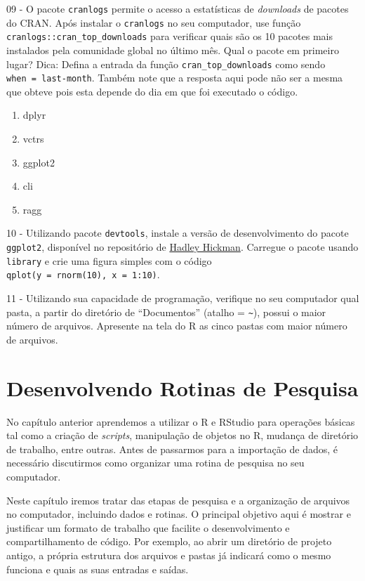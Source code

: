 \documentclass[
  11pt,
]{book}
\providecommand{\tightlist}{%
  \setlength{\itemsep}{0pt}\setlength{\parskip}{0pt}}
\begin{document}
09 -
O pacote \texttt{cranlogs} permite o acesso a estatísticas de \emph{downloads} de pacotes do CRAN. Após instalar o \texttt{cranlogs} no seu computador, use função \texttt{cranlogs::cran\_top\_downloads} para verificar quais são os 10 pacotes mais instalados pela comunidade global no último mês. Qual o pacote em primeiro lugar? Dica: Defina a entrada da função \texttt{cran\_top\_downloads} como sendo \texttt{when\ =\ \textquotesingle{}last-month\textquotesingle{}}. Também note que a resposta aqui pode não ser a mesma que obteve pois esta depende do dia em que foi executado o código.

\begin{enumerate}
\def\labelenumi{\alph{enumi})}
\tightlist
\item
  dplyr
\item
  vctrs
\item
  ggplot2
\item
  cli
\item
  ragg
\end{enumerate}

10 -
Utilizando pacote \texttt{devtools}, instale a versão de desenvolvimento do pacote \texttt{ggplot2}, disponível no repositório de \href{https://github.com/hadley}{Hadley Hickman}. Carregue o pacote usando \texttt{library} e crie uma figura simples com o código \texttt{qplot(y\ =\ rnorm(10),\ x\ =\ 1:10)}.

11 -
Utilizando sua capacidade de programação, verifique no seu computador qual pasta, a partir do diretório de ``Documentos'' (atalho = \texttt{\textasciitilde{}}), possui o maior número de arquivos. Apresente na tela do R as cinco pastas com maior número de arquivos.

\hypertarget{scripts-pesquisa}{%
\chapter{Desenvolvendo Rotinas de Pesquisa}\label{scripts-pesquisa}}

No capítulo anterior aprendemos a utilizar o R e RStudio para operações básicas tal como a criação de \emph{scripts}, manipulação de objetos no R, mudança de diretório de trabalho, entre outras. Antes de passarmos para a importação de dados, é necessário discutirmos como organizar uma rotina de pesquisa no seu computador.

Neste capítulo iremos tratar das etapas de pesquisa e a organização de arquivos no computador, incluindo dados e rotinas. O principal objetivo aqui é mostrar e justificar um formato de trabalho que facilite o desenvolvimento e compartilhamento de código. Por exemplo, ao abrir um diretório de projeto antigo, a própria estrutura dos arquivos e pastas já indicará como o mesmo funciona e quais as suas entradas e saídas.
\end{document}
